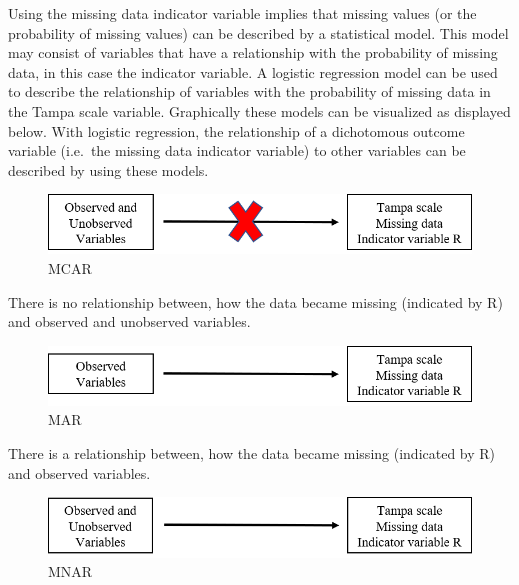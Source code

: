\documentclass[]{book}
\begin{document}
Using the missing data indicator variable implies that missing values
(or the probability of missing values) can be described by a statistical
model. This model may consist of variables that have a relationship with
the probability of missing data, in this case the indicator variable. A
logistic regression model can be used to describe the relationship of
variables with the probability of missing data in the Tampa scale
variable. Graphically these models can be visualized as displayed below.
With logistic regression, the relationship of a dichotomous outcome
variable (i.e.~the missing data indicator variable) to other variables
can be described by using these models.

\begin{figure}

{\centering \includegraphics[width=0.9\linewidth]{images/fig2.9a} 

}

\caption{MCAR}\label{fig:fig2-9a}
\end{figure}

There is no relationship between, how the data became missing (indicated
by R) and observed and unobserved variables.

\begin{figure}

{\centering \includegraphics[width=0.9\linewidth]{images/fig2.9b} 

}

\caption{MAR}\label{fig:fig2-9b}
\end{figure}

There is a relationship between, how the data became missing (indicated
by R) and observed variables.

\begin{figure}

{\centering \includegraphics[width=0.9\linewidth]{images/fig2.9c} 

}

\caption{MNAR}\label{fig:fig2-9c}
\end{figure}
\end{document}
